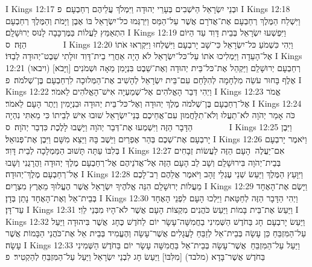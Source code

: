 I Kings 12:17	וּבְנֵי יִשְׂרָאֵל הַיֹּשְׁבִים בְּעָרֵי יְהוּדָה וַיִּמְלֹךְ עֲלֵיהֶם רְחַבְעָם׃ {פ}
I Kings 12:18	וַיִּשְׁלַח הַמֶּלֶךְ רְחַבְעָם אֶת־אֲדֹרָם אֲשֶׁר עַל־הַמַּס וַיִּרְגְּמוּ כל־יִשְׂרָאֵל בּוֹ אֶבֶן וַיָּמֹת וְהַמֶּלֶךְ רְחַבְעָם הִתְאַמֵּץ לַעֲלוֹת בַּמֶּרְכָּבָה לָנוּס יְרוּשָׁלָ͏ִם׃
I Kings 12:19	וַיִּפְשְׁעוּ יִשְׂרָאֵל בְּבֵית דָּוִד עַד הַיּוֹם הַזֶּה׃ {ס}        
I Kings 12:20	וַיְהִי כִּשְׁמֹעַ כּל־יִשְׂרָאֵל כִּי־שָׁב יָרבְעָם וַיִּשְׁלְחוּ וַיִּקְרְאוּ אֹתוֹ אֶל־הָעֵדָה וַיַּמְלִיכוּ אֹתוֹ עַל־כּל־יִשְׂרָאֵל לֹא הָיָה אַחֲרֵי בֵית־דָּוִד זוּלָתִי שֵׁבֶט־יְהוּדָה לְבַדּוֹ׃
I Kings 12:21	(ויבאו) [וַיָּבֹא] רְחַבְעָם יְרוּשָׁלַ͏ִם וַיַּקְהֵל אֶת־כּל־בֵּית יְהוּדָה וְאֶת־שֵׁבֶט בִּנְיָמִן מֵאָה וּשְׁמֹנִים אֶלֶף בָּחוּר עֹשֵׂה מִלְחָמָה לְהִלָּחֵם עִם־בֵּית יִשְׂרָאֵל לְהָשִׁיב אֶת־הַמְּלוּכָה לִרְחַבְעָם בֶּן־שְׁלֹמֹה׃ {פ}
I Kings 12:22	וַיְהִי דְּבַר הָאֱלֹהִים אֶל־שְׁמַעְיָה אִישׁ־הָאֱלֹהִים לֵאמֹר׃
I Kings 12:23	אֱמֹר אֶל־רְחַבְעָם בֶּן־שְׁלֹמֹה מֶלֶךְ יְהוּדָה וְאֶל־כּל־בֵּית יְהוּדָה וּבִנְיָמִין וְיֶתֶר הָעָם לֵאמֹר׃
I Kings 12:24	כֹּה אָמַר יְהֹוָה לֹא־תַעֲלוּ וְלֹא־תִלָּחֲמוּן עִם־אֲחֵיכֶם בְּנֵי־יִשְׂרָאֵל שׁוּבוּ אִישׁ לְבֵיתוֹ כִּי מֵאִתִּי נִהְיָה הַדָּבָר הַזֶּה וַיִּשְׁמְעוּ אֶת־דְּבַר יְהֹוָה וַיָּשֻׁבוּ לָלֶכֶת כִּדְבַר יְהֹוָה׃ {ס}        
I Kings 12:25	וַיִּבֶן יָרבְעָם אֶת־שְׁכֶם בְּהַר אֶפְרַיִם וַיֵּשֶׁב בָּהּ וַיֵּצֵא מִשָּׁם וַיִּבֶן אֶת־פְּנוּאֵל׃
I Kings 12:26	וַיֹּאמֶר יָרבְעָם בְּלִבּוֹ עַתָּה תָּשׁוּב הַמַּמְלָכָה לְבֵית דָּוִד׃
I Kings 12:27	אִם־יַעֲלֶה  הָעָם הַזֶּה לַעֲשׂוֹת זְבָחִים בְּבֵית־יְהֹוָה בִּירוּשָׁלַ͏ִם וְשָׁב לֵב הָעָם הַזֶּה אֶל־אֲדֹנֵיהֶם אֶל־רְחַבְעָם מֶלֶךְ יְהוּדָה וַהֲרָגֻנִי וְשָׁבוּ אֶל־רְחַבְעָם מֶלֶךְ־יְהוּדָה׃
I Kings 12:28	וַיִּוָּעַץ הַמֶּלֶךְ וַיַּעַשׂ שְׁנֵי עֶגְלֵי זָהָב וַיֹּאמֶר אֲלֵהֶם רַב־לָכֶם מֵעֲלוֹת יְרוּשָׁלַ͏ִם הִנֵּה אֱלֹהֶיךָ יִשְׂרָאֵל אֲשֶׁר הֶעֱלוּךָ מֵאֶרֶץ מִצְרָיִם׃
I Kings 12:29	וַיָּשֶׂם אֶת־הָאֶחָד בְּבֵית־אֵל וְאֶת־הָאֶחָד נָתַן בְּדָן׃
I Kings 12:30	וַיְהִי הַדָּבָר הַזֶּה לְחַטָּאת וַיֵּלְכוּ הָעָם לִפְנֵי הָאֶחָד עַד־דָּן׃
I Kings 12:31	וַיַּעַשׂ אֶת־בֵּית בָּמוֹת וַיַּעַשׂ כֹּהֲנִים מִקְצוֹת הָעָם אֲשֶׁר לֹא־הָיוּ מִבְּנֵי לֵוִי׃
I Kings 12:32	וַיַּעַשׂ יָרבְעָם  חָג בַּחֹדֶשׁ הַשְּׁמִינִי בַחֲמִשָּׁה־עָשָׂר יוֹם  לַחֹדֶשׁ כֶּחָג  אֲשֶׁר בִּיהוּדָה וַיַּעַל עַל־הַמִּזְבֵּחַ כֵּן עָשָׂה בְּבֵית־אֵל לְזַבֵּחַ לָעֲגָלִים אֲשֶׁר־עָשָׂה וְהֶעֱמִיד בְּבֵית אֵל אֶת־כֹּהֲנֵי הַבָּמוֹת אֲשֶׁר עָשָׂה׃
I Kings 12:33	וַיַּעַל עַל־הַמִּזְבֵּחַ  אֲשֶׁר־עָשָׂה בְּבֵית־אֵל בַּחֲמִשָּׁה עָשָׂר יוֹם בַּחֹדֶשׁ הַשְּׁמִינִי בַּחֹדֶשׁ אֲשֶׁר־בָּדָא (מלבד) [מִלִּבּוֹ] וַיַּעַשׂ חָג לִבְנֵי יִשְׂרָאֵל וַיַּעַל עַל־הַמִּזְבֵּחַ לְהַקְטִיר׃ {פ}
